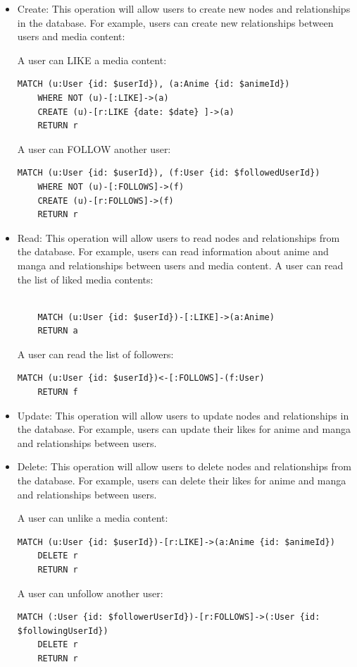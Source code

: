\begin{itemize}
    \item Create: This operation will allow users to create new nodes and relationships in the database. For example, users can create new relationships between users and media content:
    
    A user can LIKE a media content: 
    \begin{lstlisting}[language=Cypher, caption=Create Like Relationship]
    MATCH (u:User {id: $userId}), (a:Anime {id: $animeId}) 
    WHERE NOT (u)-[:LIKE]->(a) 
    CREATE (u)-[r:LIKE {date: $date} ]->(a)
    RETURN r
    \end{lstlisting}

    A user can FOLLOW another user:
    \begin{lstlisting}[language=Cypher, caption=Create Follow Relationship]
    MATCH (u:User {id: $userId}), (f:User {id: $followedUserId}) 
    WHERE NOT (u)-[:FOLLOWS]->(f) 
    CREATE (u)-[r:FOLLOWS]->(f) 
    RETURN r
    \end{lstlisting}

    \item Read: This operation will allow users to read nodes and relationships from the database. For example, users can read information about anime and manga and relationships between users and media content.
    A user can read the list of liked media contents:
    \begin{lstlisting}[language=Cypher, caption=Read Liked Media Contents]
  
    MATCH (u:User {id: $userId})-[:LIKE]->(a:Anime)
    RETURN a
    \end{lstlisting}

    A user can read the list of followers:
    \begin{lstlisting}[language=Cypher, caption=Read Followers]
    MATCH (u:User {id: $userId})<-[:FOLLOWS]-(f:User)
    RETURN f
    \end{lstlisting}
  
    \item Update: This operation will allow users to update nodes and relationships in the database. For example, users can update their likes for anime and manga and relationships between users.
    
    \item Delete: This operation will allow users to delete nodes and relationships from the database. For example, users can delete their likes for anime and manga and relationships between users.
    
    A user can unlike a media content:
    \begin{lstlisting}[language=Cypher, caption=Delete Like Relationship]
    MATCH (u:User {id: $userId})-[r:LIKE]->(a:Anime {id: $animeId})
    DELETE r
    RETURN r
    \end{lstlisting}
    \newpage
    A user can unfollow another user: 
    \begin{lstlisting}[language=Cypher, caption=Delete Follow Relationship]
    MATCH (:User {id: $followerUserId})-[r:FOLLOWS]->(:User {id: $followingUserId})
    DELETE r 
    RETURN r
    \end{lstlisting}
\end{itemize}


